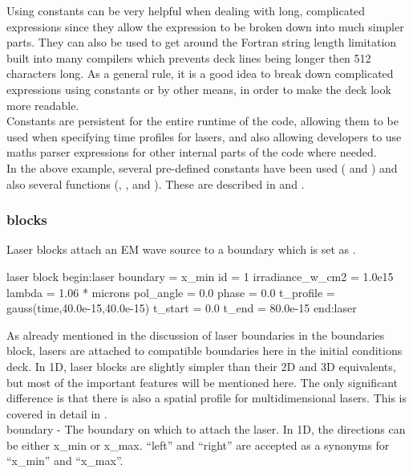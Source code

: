 Using constants can be very helpful when dealing with long,
complicated expressions since they allow the expression to be broken down into
much simpler parts. They can also be used to get around the Fortran string
length limitation built into many compilers which prevents deck lines being
longer then 512 characters long. As a general rule, it is a good idea to break
down complicated expressions using constants or by other means, in order to
make the deck look more readable.\\

Constants are persistent for the entire runtime of the code,
allowing them to be used when specifying time profiles for lasers, and also
allowing developers to use maths parser expressions for other internal parts of
the code where needed.\\

In the above example, several pre-defined constants have been used
( and ) and also several functions
(, ,  and
). These are described in  and
.

\subsubsection{ blocks}
\label{sec:lasers}
Laser blocks attach an EM wave source to a boundary which is set as
.

\begin{lboxverbatim}{laser block}
begin:laser
   boundary = x_min
   id = 1
   irradiance_w_cm2 = 1.0e15
   lambda = 1.06 * microns
   pol_angle = 0.0
   phase = 0.0
   t_profile = gauss(time,40.0e-15,40.0e-15)
   t_start = 0.0
   t_end = 80.0e-15
end:laser
\end{lboxverbatim}

As already mentioned in the discussion of laser boundaries in the boundaries
block, lasers are attached to compatible boundaries here in the initial
conditions deck. In 1D, laser blocks are slightly simpler than their 2D and 3D
equivalents, but most of the important features will be mentioned here. The
only significant difference is that there is also a spatial profile for
multidimensional lasers. This is covered in detail in
.\\

{\emphtext boundary} - The boundary on which to attach the laser.
In 1D, the directions can be either x\_min or x\_max.  ``left'' and ``right''
are accepted as a synonyms for ``x\_min'' and ``x\_max''.\\

